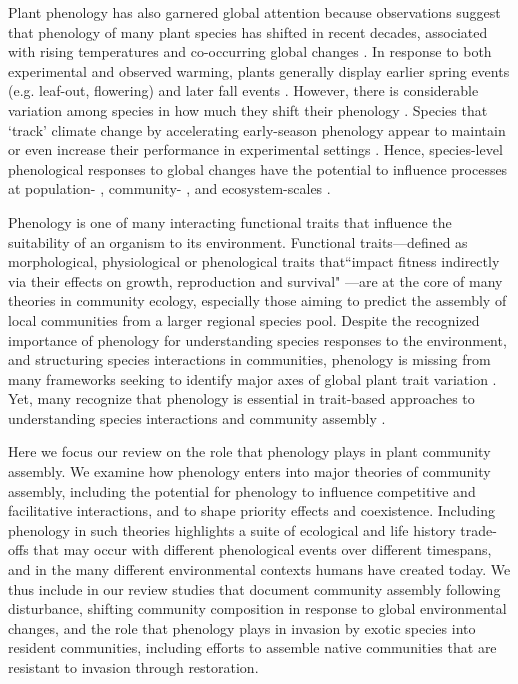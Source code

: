 \documentclass[11pt]{article}
\begin{document}
Plant phenology has also garnered global attention because observations suggest that phenology of many plant species has shifted in recent decades, associated with rising temperatures and co-occurring global changes \citep{wolkovich2012warming,parmesan2015plants,menzel2020climate}. In response to both experimental and observed warming, plants generally display earlier spring events (e.g. leaf-out, flowering) and later fall events \citep[e.g. senescence,][]{Henry:1997lg,menzel2020climate}. However, there is considerable variation among species in how much they shift their phenology \citep[][sometimes termed `phenological sensitivity']{cook2012divergent,wolkovich2012warming,konig2018advances}. Species that `track' climate change by accelerating early-season phenology appear to maintain or even increase their performance in experimental settings \citep{cleland2012phenological,wolkovich2021phenological}. Hence, species-level phenological responses to global changes have the potential to influence processes at population- \citep{iler2021demographic}, community- \citep{cook2012divergent,caradonna2014shifts}, and ecosystem-scales \citep{piao2019plant}.

Phenology is one of many interacting functional traits that influence the suitability of an organism to its environment. Functional traits---defined as morphological, physiological or phenological traits that``impact fitness indirectly via their effects on growth, reproduction and survival" \citep{violle2007let}---are at the core of many theories in community ecology, especially those aiming to predict the assembly of local communities from a larger regional species pool. Despite the recognized importance of phenology for understanding species responses to the environment, and structuring species interactions in communities, phenology is missing from many frameworks seeking to identify major axes of global plant trait variation \citep[e.g.][]{westoby1998leaf,wright2004worldwide,diaz2016global,joswig2022climatic}. Yet, many recognize that phenology is essential in trait-based approaches to understanding species interactions and community assembly \citep{cope2022role}.

Here we focus our review on the role that phenology plays in plant community assembly. We examine how phenology enters into major theories of community assembly, including the potential for phenology to influence competitive and facilitative interactions, and to shape priority effects and coexistence. Including phenology in such theories highlights a suite of ecological and life history trade-offs that may occur with different phenological events over different timespans, and in the many different environmental contexts humans have created today. We thus include in our review studies that document community assembly following disturbance, shifting community composition in response to global environmental changes, and the role that phenology plays in invasion by exotic species into resident communities, including efforts to assemble native communities that are resistant to invasion through restoration. 
\end{document}
